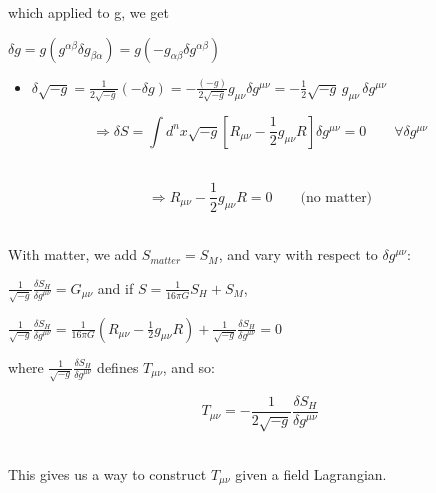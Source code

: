 \documentclass[10pt]{article}
\begin{document}
	which applied to g, we get \\ \par

	$\delta g = g(g^{\alpha\beta}\delta g_{\beta\alpha}) = g(-g_{\alpha\beta}\delta g^{\alpha\beta})$ \\ \par
	\begin{itemize}[label=*]
	\item $\delta\sqrt{-g} = \frac{1}{2\sqrt{-g}}(-\delta g) = -\frac{(-g)}{2\sqrt{-g}}g_{\mu \nu}\delta g^{\mu \nu} = 
	-\frac{1}{2}\sqrt{-g}\,g_{\mu\nu}\,\delta g^{\mu\nu}$
	\end{itemize}

	$$\Rightarrow \delta S = \int d^{n}x \sqrt{-g}[R_{\mu\nu} - \frac{1}{2}g_{\mu\nu}R]\delta g^{\mu\nu} = 0
	\qquad \forall \delta g^{\mu\nu}$$ \\ \par

	$$\Rightarrow \boxed{R_{\mu\nu} - \frac{1}{2}g_{\mu\nu}R = 0} \qquad \text{(no matter)}$$ \\ \par

	With matter, we add $S_{matter} = S_{M}$, and vary with respect to $\delta g^{\mu\nu}$: \\ \par

	$\frac{1}{\sqrt{-g}}\frac{\delta S_{H}}{\delta g^{\mu\nu}}=G_{\mu\nu}$ and if $S=\frac{1}{16\pi G}S_{H}+S_{M}$, \\ \par

	$\frac{1}{\sqrt{-g}}\frac{\delta S_{H}}{\delta g^{\mu\nu}}=\frac{1}{16\pi G}(R_{\mu\nu} - \frac{1}{2}g_{\mu\nu}R)+
	\frac{1}{\sqrt{-g}}\frac{\delta S_{H}}{\delta g^{\mu\nu}}=0$ \\ \par

	where $\frac{1}{\sqrt{-g}}\frac{\delta S_{H}}{\delta g^{\mu\nu}}$ defines $T_{\mu\nu}$, and so: \\ \par

	$$\boxed{T_{\mu\nu}=-\frac{1}{2\sqrt{-g}}\frac{\delta S_{H}}{\delta g^{\mu\nu}}}$$ \\ \par

	This gives us a way to construct $T_{\mu\nu}$ given a field Lagrangian.

    

\end{document}
